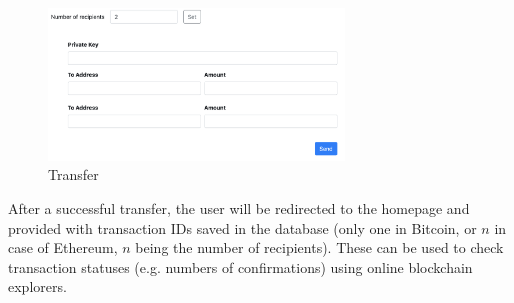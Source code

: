 \begin{figure}[ht]
    \centering
    \includegraphics[width=0.7\textwidth]{assets/transfers.png}
    \caption{Transfer}
    \label{5:fig:transfers}
\end{figure}

After a successful transfer, the user will be redirected to the homepage
and provided with transaction IDs saved in the database
(only one in Bitcoin, or $n$ in case of Ethereum,
$n$ being the number of recipients).
These can be used to check transaction statuses
(e.g. numbers of confirmations)
using online blockchain explorers.
